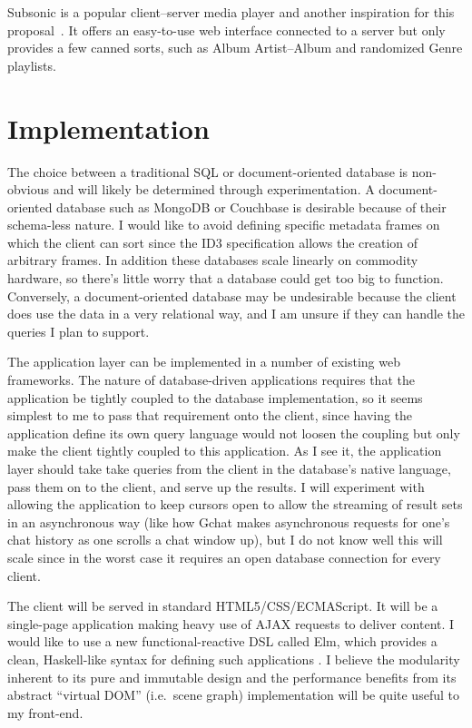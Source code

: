 \documentclass{abrice}
\begin{document}
Subsonic is a popular client--server media player and another inspiration for
this proposal~\cite{subsonic}. It offers an easy-to-use web interface connected
to a server but only provides a few canned sorts, such as Album Artist--Album
and randomized Genre playlists.

\section{Implementation}

The choice between a traditional SQL or document-oriented database is
non-obvious and will likely be determined through experimentation. A
document-oriented database such as MongoDB or Couchbase is desirable because of
their schema-less nature. I would like to avoid defining specific metadata
frames on which the client can sort since the ID3 specification allows the
creation of arbitrary frames. In addition these databases scale linearly on
commodity hardware, so there's little worry that a database could get too big to
function. Conversely, a document-oriented database may be undesirable because
the client does use the data in a very relational way, and I am unsure if they
can handle the queries I plan to support.

The application layer can be implemented in a number of existing web
frameworks. The nature of database-driven applications requires that the
application be tightly coupled to the database implementation, so it seems
simplest to me to pass that requirement onto the client, since having the
application define its own query language would not loosen the coupling but only
make the client tightly coupled to this application. As I see it, the
application layer should take take queries from the client in the database's
native language, pass them on to the client, and serve up the results. I will
experiment with allowing the application to keep cursors open to allow the
streaming of result sets in an asynchronous way (like how Gchat makes
asynchronous requests for one's chat history as one scrolls a chat window up),
but I do not know well this will scale since in the worst case it requires an
open database connection for every client.

The client will be served in standard HTML5/CSS/ECMAScript. It will be a
single-page application making heavy use of AJAX requests to deliver content.  I
would like to use a new functional-reactive DSL called Elm, which provides a
clean, Haskell-like syntax for defining such applications \cite{czaplicki}. I
believe the modularity inherent to its pure and immutable design and the
performance benefits from its abstract ``virtual DOM'' (i.e.\ scene graph)
implementation will be quite useful to my front-end.
\end{document}
